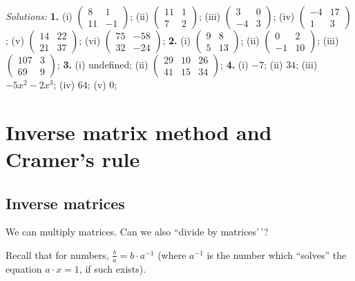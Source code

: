 \documentclass[
  english,
  12pt,
  oneside]{book}
\theoremstyle{definition}
\theoremstyle{definition}
\theoremstyle{definition}
\theoremstyle{definition}
\theoremstyle{remark}
\begin{document}
\emph{Solutions:}
\textbf{1.} (i) \(\begin{pmatrix}8&1\\11&-1\end{pmatrix}\);
(ii) \(\begin{pmatrix}11&1\\7&2\end{pmatrix}\);
(iii) \(\begin{pmatrix}3&0\\-4&3\end{pmatrix}\);
(iv) \(\begin{pmatrix}-4&17\\1&3\end{pmatrix}\);
(v) \(\begin{pmatrix}14&22\\21&37\end{pmatrix}\);
(vi) \(\begin{pmatrix}75&-58\\32&-24\end{pmatrix}\);
\textbf{2.} (i) \(\begin{pmatrix}9&8\\5&13\end{pmatrix}\);
(ii) \(\begin{pmatrix}0&2\\-1&10\end{pmatrix}\);
(iii) \(\begin{pmatrix}107&3\\69&9\end{pmatrix}\);
\textbf{3.} (i) undefined; (ii) \(\begin{pmatrix}29&10&26\\41&15&34\end{pmatrix}\);
\textbf{4.} (i) \(-7\); (ii) \(34\); (iii) \(-5x^2-2x^3\); (iv) \(64\); (v) \(0\);

\chapter{Inverse matrix method and Cramer's rule}\label{inverse-matrix-method-and-cramers-rule}

\section{Inverse matrices}\label{inverse-matrices}

We can multiply matrices. Can we also ``divide by matrices'\,'?

Recall that for numbers, \(\frac{b}{a} = b \cdot a^{-1}\) (where \(a^{-1}\) is the number which ``solves'' the equation \(a\cdot x = 1\), if such exists).
\end{document}

